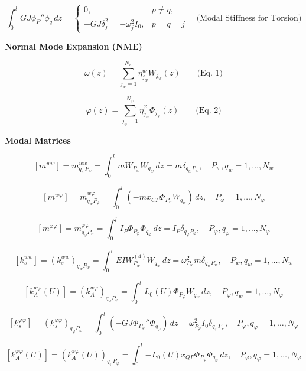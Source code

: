 \documentclass[11pt]{article}
\begin{document}
\[
\int_{0}^{l}{GJ\phi_{P}''\phi_{q}\,dz} =
\begin{cases}
0, & p \neq q,\\[4pt]
- GJ\delta_{j}^{2} = - \omega_{j}^{2}I_{0}, & p = q = j
\end{cases}
\quad \text{(Modal Stiffness for Torsion)}
\]

\textbf{Normal Mode Expansion (NME)}

\[
\omega(z) = \sum_{j_{w}=1}^{N_{w}}{\eta_{j_{w}}^{w}W_{j_{w}}(z)}
\qquad \text{(Eq. 1)}
\]

\[
\varphi(z) = \sum_{j_{\varphi} = 1}^{N_{\varphi}}{\eta_{j_{\varphi}}^{\varphi}\Phi_{j_{\varphi}}(z)}
\qquad \text{(Eq. 2)}
\]

\textbf{Modal Matrices}

\[
\left[ m^{ww} \right] =
m_{q_{w}P_{w}}^{ww} =
\int_{0}^{l}{mW_{P_{w}}W_{q_{w}}\,dz}
= m\delta_{q_{w}P_{w}},
\quad P_{w},q_{w} = 1,\ldots, N_{w}
\]

\[
\left[ m^{w\varphi} \right] =
m_{q_{w}P_{\varphi}}^{w\varphi} =
\int_{0}^{l}{\left( - m x_{CP}\Phi_{P_{\varphi}}W_{q_{w}} \right)\,dz},
\quad P_{\varphi} = 1,\ldots,N_{\varphi}
\]

\[
\left[ m^{\varphi\varphi} \right] =
m_{q_{\varphi}P_{\varphi}}^{\varphi\varphi} =
\int_{0}^{l}{I_{P}\Phi_{P_{\varphi}}\Phi_{q_{\varphi}}\,dz}
= I_{P}\delta_{q_{\varphi}P_{\varphi}},
\quad P_{\varphi},q_{\varphi} = 1,\ldots,N_{\varphi}
\]

\[
\left[ k_{s}^{ww} \right] =
\left( k_{s}^{ww} \right)_{q_{w}P_{w}} =
\int_{0}^{l}{EIW_{P_{w}}^{(4)}W_{q_{w}}\,dz}
= \omega_{P_{w}}^{2}m\delta_{q_{w}P_{w}},
\quad P_{w},q_{w} = 1,\ldots,N_{w}
\]

\[
\left[ k_{A}^{w\varphi}(U) \right] =
\left( k_{A}^{w\varphi} \right)_{q_{w}P_{\varphi}} =
\int_{0}^{l}{L_{0}(U)\Phi_{P_{\varphi}}W_{q_{w}}\,dz},
\quad P_{\varphi},q_{w} = 1,\ldots,N_{\varphi}
\]

\[
\left[ k_{s}^{\varphi\varphi} \right] =
\left( k_{s}^{\varphi\varphi} \right)_{q_{\varphi}P_{\varphi}} =
\int_{0}^{l}{\left( - GJ\Phi_{P_{\varphi}}''\Phi_{q_{\varphi}} \right)\,dz}
= \omega_{P_{\varphi}}^{2}I_{0}\delta_{q_{\varphi}P_{\varphi}},
\quad P_{\varphi},q_{\varphi} = 1,\ldots,N_{\varphi}
\]

\[
\left[ k_{A}^{\varphi\varphi}(U) \right] =
\left( k_{A}^{\varphi\varphi}(U) \right)_{q_{\varphi}P_{\varphi}} =
\int_{0}^{l}{- L_{0}(U)x_{QP}\Phi_{P_{\varphi}}\Phi_{q_{\varphi}}\,dz},
\quad P_{\varphi}, q_{\varphi} = 1,\ldots, N_{\varphi}
\]
\end{document}
